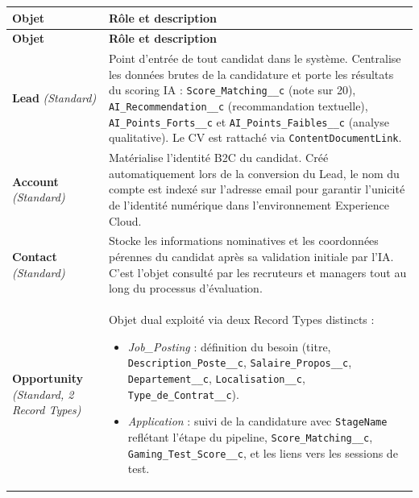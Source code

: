 \begin{longtable}{|p{4.2cm}|p{10.8cm}|}
\hline
\textbf{Objet} & \textbf{Rôle et description} \\
\hline
\endfirsthead

\hline
\textbf{Objet} & \textbf{Rôle et description} \\
\hline
\endhead

\endfoot

\hline
\endlastfoot

\textbf{Lead} \newline\textit{(Standard)} & Point d'entrée de tout candidat dans le système. Centralise les données brutes de la candidature et porte les résultats du scoring IA : \texttt{Score\_Matching\_\_c} (note sur 20), \texttt{AI\_Recommendation\_\_c} (recommandation textuelle), \texttt{AI\_Points\_Forts\_\_c} et \texttt{AI\_Points\_Faibles\_\_c} (analyse qualitative). Le CV est rattaché via \texttt{ContentDocumentLink}. \\
\hline

\textbf{Account} \newline\textit{(Standard)} & Matérialise l'identité B2C du candidat. Créé automatiquement lors de la conversion du Lead, le nom du compte est indexé sur l'adresse email pour garantir l'unicité de l'identité numérique dans l'environnement Experience Cloud. \\
\hline

\textbf{Contact} \newline\textit{(Standard)} & Stocke les informations nominatives et les coordonnées pérennes du candidat après sa validation initiale par l'IA. C'est l'objet consulté par les recruteurs et managers tout au long du processus d'évaluation. \\
\hline

\textbf{Opportunity} \newline\textit{(Standard, 2 Record Types)} & Objet dual exploité via deux Record Types distincts :
\begin{itemize}[nosep,leftmargin=*]
    \item \textit{Job\_Posting} : définition du besoin (titre, \texttt{Description\_Poste\_\_c}, \texttt{Salaire\_Propos\_\_c}, \texttt{Departement\_\_c}, \texttt{Localisation\_\_c}, \texttt{Type\_de\_Contrat\_\_c}).
    \item \textit{Application} : suivi de la candidature avec \texttt{StageName} reflétant l'étape du pipeline, \texttt{Score\_Matching\_\_c}, \texttt{Gaming\_Test\_Score\_\_c}, et les liens vers les sessions de test.
\end{itemize} \\
\hline


\end{longtable}

